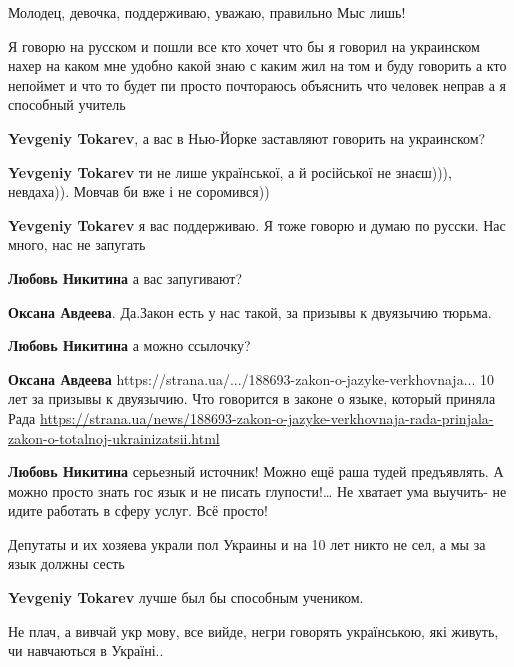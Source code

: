 \begin{itemize}

Молодец, девочка, поддерживаю, уважаю, правильно Мыс лишь!


Я говорю на русском и пошли все кто хочет что бы я говорил на украинском нахер
на каком мне удобно какой знаю с каким жил на том и буду говорить а кто
непоймет и что то будет пи просто почтораюсь объяснить что человек неправ а я
способный учитель

\begin{itemize}
\textbf{Yevgeniy Tokarev}, а вас в Нью-Йорке заставляют говорить на украинском?

\textbf{Yevgeniy Tokarev} ти не лише української, а й російської не знаєш))), невдаха)). Мовчав би вже і не соромився))

\textbf{Yevgeniy Tokarev} я вас поддерживаю. Я тоже говорю и думаю по русски. Нас много, нас не запугать

\textbf{Любовь Никитина} а вас запугивают?

\textbf{Оксана Авдеева}. Да.Закон есть у нас такой, за призывы к двуязычию тюрьма.

\textbf{Любовь Никитина} а можно ссылочку?

\textbf{Оксана Авдеева} https://strana.ua/.../188693-zakon-o-jazyke-verkhovnaja...
10 лет за призывы к двуязычию. Что говорится в законе о языке, который приняла Рада
\url{https://strana.ua/news/188693-zakon-o-jazyke-verkhovnaja-rada-prinjala-zakon-o-totalnoj-ukrainizatsii.html}

\textbf{Любовь Никитина} серьезный источник!
Можно ещё раша тудей предъявлять.
А можно просто знать гос язык и не писать глупости!… 
Не хватает ума выучить- не идите работать в сферу услуг.
Всё просто!

Депутаты и их хозяева украли пол Украины и на 10 лет никто не сел, а мы за язык должны сесть

\textbf{Yevgeniy Tokarev} лучше был бы способным учеником.
\end{itemize}


Не плач, а вивчай укр мову, все вийде, негри говорять українською, які живуть,
чи навчаються в Україні..

\begin{itemize}


\end{itemize}
\end{itemize}
